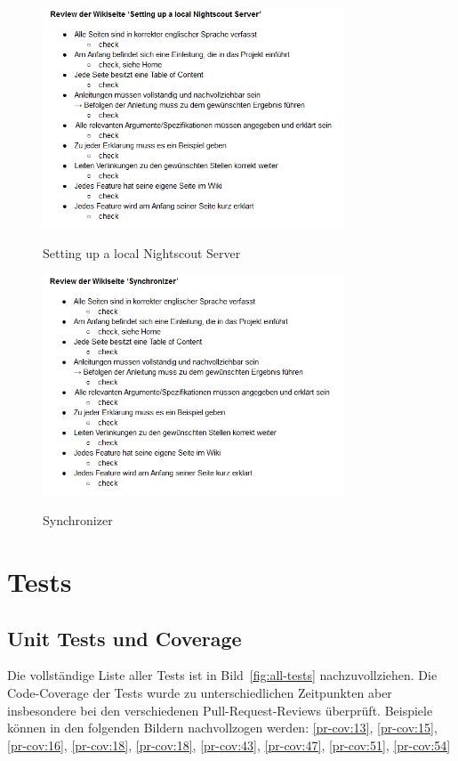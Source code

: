 \documentclass[accentcolor=tud0b,12pt,paper=a4]{tudreport}
\begin{document}
\begin{figure}[h]
\centering
\caption{Setting up a local Nightscout Server}
\includegraphics[width=0.8\textwidth]{wiki14}
\label{wiki14}
\end{figure}

\begin{figure}[h]
\centering
\caption{Synchronizer}
\includegraphics[width=0.8\textwidth]{wiki15}
\label{wiki15}
\end{figure}


\section{Tests}
\subsection{Unit Tests und Coverage}
Die vollständige Liste aller Tests ist in Bild~\ref{fig:all-tests} nachzuvollziehen.
Die Code-Coverage der Tests wurde zu unterschiedlichen Zeitpunkten aber insbesondere bei den verschiedenen Pull-Request-Reviews überprüft. Beispiele können in den folgenden Bildern nachvollzogen werden: \ref{pr-cov:13}, \ref{pr-cov:15}, \ref{pr-cov:16}, \ref{pr-cov:18}, \ref{pr-cov:18}, \ref{pr-cov:43}, \ref{pr-cov:47}, \ref{pr-cov:51}, \ref{pr-cov:54}
\end{document}
